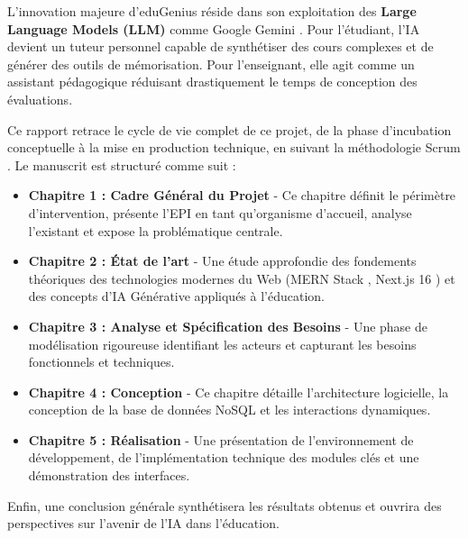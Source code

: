 L'innovation majeure d'eduGenius réside dans son exploitation des \textbf{Large Language Models (LLM)} comme Google Gemini \cite{google_gemini}. Pour l'étudiant, l'IA devient un tuteur personnel capable de synthétiser des cours complexes et de générer des outils de mémorisation. Pour l'enseignant, elle agit comme un assistant pédagogique réduisant drastiquement le temps de conception des évaluations.

Ce rapport retrace le cycle de vie complet de ce projet, de la phase d'incubation conceptuelle à la mise en production technique, en suivant la méthodologie Scrum \cite{scrum_guide}. Le manuscrit est structuré comme suit :

\begin{itemize}
    \item \textbf{Chapitre 1 : Cadre Général du Projet} - Ce chapitre définit le périmètre d'intervention, présente l'EPI en tant qu'organisme d'accueil, analyse l'existant et expose la problématique centrale.
    \item \textbf{Chapitre 2 : État de l'art} - Une étude approfondie des fondements théoriques des technologies modernes du Web (MERN Stack \cite{mern_stack}, Next.js 16 \cite{nextjs_docs}) et des concepts d'IA Générative appliqués à l'éducation.
    \item \textbf{Chapitre 3 : Analyse et Spécification des Besoins} - Une phase de modélisation rigoureuse identifiant les acteurs et capturant les besoins fonctionnels et techniques.
    \item \textbf{Chapitre 4 : Conception} - Ce chapitre détaille l'architecture logicielle, la conception de la base de données NoSQL \cite{mongodb_manual} et les interactions dynamiques.
    \item \textbf{Chapitre 5 : Réalisation} - Une présentation de l'environnement de développement, de l'implémentation technique des modules clés et une démonstration des interfaces.
\end{itemize}

Enfin, une conclusion générale synthétisera les résultats obtenus et ouvrira des perspectives sur l'avenir de l'IA dans l'éducation.
